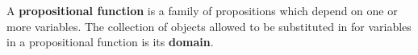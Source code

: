 





\begin{defn}
A \textbf{propositional function} is a family of propositions which depend on one or more variables. The collection of objects allowed to be substituted in for variables in a propositional function is its \textbf{domain}. 
\end{defn}

